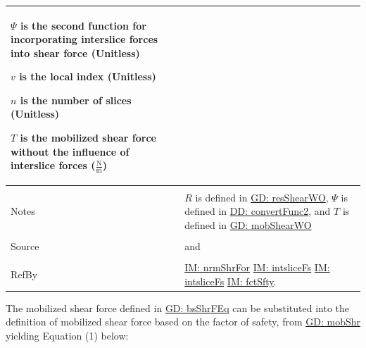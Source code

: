 \documentclass[12pt]{article}
\begin{document}
\begin{minipage}{\textwidth}
\begin{tabular}{p{} p{}}
\begin{symbDescription}
                                                                                           \item{$Ψ$ is the second function for incorporating interslice forces into shear force (Unitless)}
                                                                                           \item{$v$ is the local index (Unitless)}
                                                                                           \item{$n$ is the number of slices (Unitless)}
                                                                                           \item{$T$ is the mobilized shear force without the influence of interslice forces ($\frac{\text{N}}{\text{m}}$)}
                                                                                           \end{symbDescription}
                                                                                           \\ \midrule \\
                                                                                           Notes & $R$ is defined in \hyperref[GD:resShearWO]{GD: resShearWO}, $Ψ$ is defined in \hyperref[DD:convertFunc2]{DD: convertFunc2}, and $T$ is defined in \hyperref[GD:mobShearWO]{GD: mobShearWO}
                                                                                                   \\ \midrule \\
                                                                                                   Source & \cite{chen2005} and \cite{karchewski2012}
                                                                                                            \\ \midrule \\
                                                                                                            RefBy & \hyperref[IM:nrmShrFor]{IM: nrmShrFor} \hyperref[IM:intsliceFs]{IM: intsliceFs} \hyperref[IM:intsliceFs]{IM: intsliceFs} \hyperref[IM:fctSfty]{IM: fctSfty}.
\\ \bottomrule \end{tabular}
\end{minipage}
The mobilized shear force defined in \hyperref[GD:bsShrFEq]{GD: bsShrFEq} can be substituted into the definition of mobilized shear force based on the factor of safety, from \hyperref[GD:mobShr]{GD: mobShr} yielding Equation (1) below:
\end{document}
